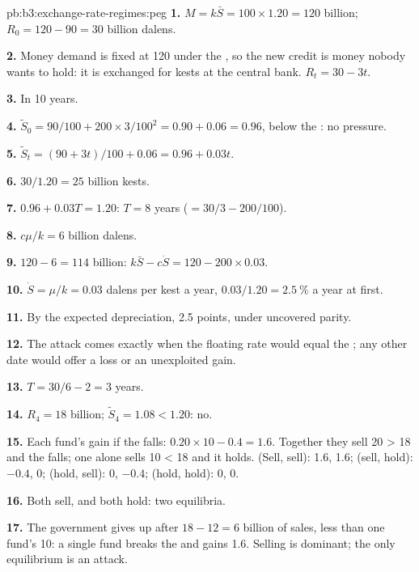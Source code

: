 \begin{solution}{pb:b3:exchange-rate-regimes:peg}
\textbf{1.} $M = k\bar S = 100 \times 1.20 = 120$ billion; $R_0 = 120 - 90 = 30$ billion dalens. %

\textbf{2.} Money demand is fixed at 120 under the , so the new credit is money
nobody wants to hold: it is exchanged for kests at the central bank. $R_t = 30 - 3t$.

\textbf{3.} In 10 years.

\textbf{4.} $\tilde S_0 = 90/100 + 200 \times 3/100^2 = 0.90 + 0.06 = 0.96$, below the : no pressure.

\textbf{5.} $\tilde S_t = (90 + 3t)/100 + 0.06 = 0.96 + 0.03t$.

\textbf{6.} $30/1.20 = 25$ billion kests.

\textbf{7.} $0.96 + 0.03T = 1.20$: $T = 8$ years ($= 30/3 - 200/100$).

\textbf{8.} $c\mu/k = 6$ billion dalens.

\textbf{9.} $120 - 6 = 114$ billion: $k\bar S - c\dot S = 120 - 200 \times 0.03$.

\textbf{10.} $\dot S = \mu/k = 0.03$ dalens per kest a year, $0.03/1.20 = 2.5~\%$ a year at first.

\textbf{11.} By the expected depreciation, 2.5 points, under uncovered parity.

\textbf{12.} The attack comes exactly when the floating rate would equal the ;
any other date would offer a loss or an unexploited gain.

\textbf{13.} $T = 30/6 - 2 = 3$ years.

\textbf{14.} $R_4 = 18$ billion; $\tilde S_4 = 1.08 < 1.20$: no.

\textbf{15.} Each fund's gain if the  falls: $0.20 \times 10 - 0.4 = 1.6$. Together they sell
20 > 18 and the  falls; one alone sells 10 < 18 and it holds. (Sell, sell): 1.6,
1.6; (sell, hold): $-0.4$, 0; (hold, sell): 0, $-0.4$; (hold, hold): 0, 0.

\textbf{16.} Both sell, and both hold: two equilibria.

\textbf{17.} The government gives up after $18 - 12 = 6$ billion of sales, less than one
fund's 10: a single fund breaks the  and gains 1.6. Selling is dominant; the
only equilibrium is an attack.


\end{solution}
